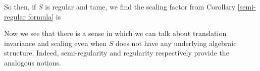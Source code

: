 


So then, if $S$ is regular and tame, we find the scaling factor from Corollary \ref{semi-regular formula} is 

Now we see that there is a sense in which we can talk about translation invariance and scaling even when $S$ does not have any underlying algebraic structure. Indeed, semi-regularity and regularity respectively provide the analogous notions.









